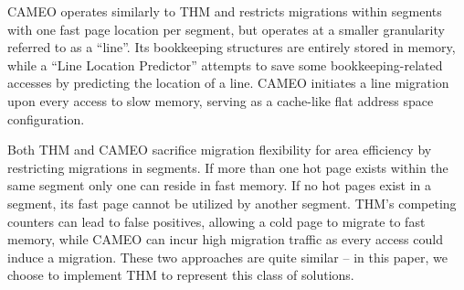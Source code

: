 CAMEO \cite{cameo} operates similarly to THM and restricts migrations within segments with one fast page location per segment, but operates at a smaller granularity referred to as a ``line''. Its bookkeeping structures are entirely stored in memory, while a ``Line Location Predictor'' attempts to save some bookkeeping-related accesses by predicting the location of a line. CAMEO initiates a line migration upon every access to slow memory, serving as a cache-like flat address space configuration.

Both THM and CAMEO sacrifice migration flexibility for area efficiency by restricting migrations in segments. If more than one hot page exists within the same segment only one can reside in fast memory. If no hot pages exist in a segment, its fast page cannot be utilized by another segment. THM's competing counters can lead to false positives, allowing a cold page to migrate to fast memory, while CAMEO can incur high migration traffic as every access could induce a
migration.  These two approaches are quite similar -- in this paper, we choose
to implement THM to represent this class of solutions.

